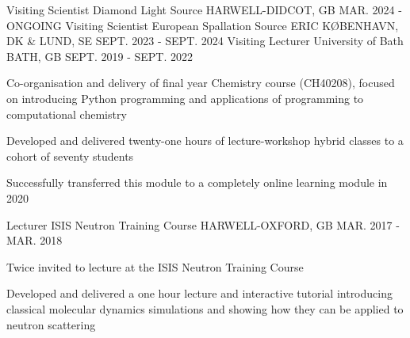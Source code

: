 \begin{cventries}
	\cventry
	{Visiting Scientist}
	{Diamond Light Source}
	{HARWELL-DIDCOT, GB}
	{MAR. 2024 - ONGOING}
	{
	}
	\cventry
	{Visiting Scientist}
	{European Spallation Source ERIC}
	{K\O BENHAVN, DK \& LUND, SE}
	{SEPT. 2023 - SEPT. 2024}
	{
	}
	\cventry
	{Visiting Lecturer}
	{University of Bath}
	{BATH, GB}
	{SEPT. 2019 - SEPT. 2022}
	{
		\begin{cvitems}
			\item {Co-organisation and delivery of final year Chemistry course (CH40208), focused on introducing Python programming and applications of programming to computational chemistry}
			\item {Developed and delivered twenty-one hours of lecture-workshop hybrid classes to a cohort of seventy students}
			\item {Successfully transferred this module to a completely online learning module in 2020}
		\end{cvitems}
	}
	\cventry
	{Lecturer}
	{ISIS Neutron Training Course}
	{HARWELL-OXFORD, GB}
	{MAR. 2017 - MAR. 2018}
	{
		\begin{cvitems}
			\item {Twice invited to lecture at the ISIS Neutron Training Course}
			\item {Developed and delivered a one hour lecture and interactive tutorial introducing classical molecular dynamics simulations and showing how they can be applied to neutron scattering}
		\end{cvitems}
	}
\end{cventries}

